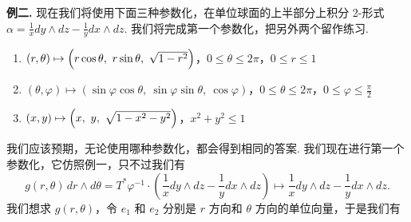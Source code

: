 \textbf{例二.} 现在我们将使用下面三种参数化，在单位球面的上半部分上积分 2-形式 $\alpha=\frac{1}{x}dy\wedge dz-\frac{1}{y}dx\wedge dz$. 我们将完成第一个参数化，把另外两个留作练习.
\begin{enumerate}
  \item[(a)] $(r,\theta)\mapsto\Bigl(r\cos\theta,\ r\sin\theta,\ \sqrt{1-r^2}\Bigr)$，$0\leq\theta\leq 2\pi$，$0\leq r\leq 1$
  \item[(b)] $(\theta,\varphi)\mapsto(\sin\varphi\cos\theta,\ \sin\varphi\sin\theta,\ \cos\varphi)$，$0\leq\theta\leq 2\pi$，$0\leq\varphi\leq\frac{\pi}{2}$
  \item[(c)] $(x,y)\mapsto\Bigl(x,\ y,\ \sqrt{1-x^2-y^2}\Bigr)$，$x^2+y^2\leq 1$
\end{enumerate}
我们应该预期，无论使用哪种参数化，都会得到相同的答案. 我们现在进行第一个参数化，它仿照例一，只不过我们有
\[
g(r,\theta)\,dr\wedge d\theta=T^*\varphi^{-1}\cdot\left(\frac{1}{x}dy\wedge dz-\frac{1}{y}dx\wedge dz\right)\longmapsto\frac{1}{x}dy\wedge dz-\frac{1}{y}dx\wedge dz.
\]
我们想求 $g(r,\theta)$，令 $e_1$ 和 $e_2$ 分别是 $r$ 方向和 $\theta$ 方向的单位向量，于是我们有
